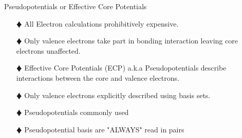 \documentclass[slidestop,mathserif,compress,xcolor=svgnames]{beamer}
\begin{document}
\begin{frame}
{\begin{block}{Pseudopotentials or Effective Core Potentials}
\begin{enumerate}
\item[$\vardiamond$]All Electron calculations prohibitively expensive.
\item[$\vardiamond$]Only valence electrons take part in bonding interaction leaving core electrons unaffected.\item[$\vardiamond$]Effective Core Potentials (ECP) a.k.a Pseudopotentials describe interactions between the core and valence electrons.
\item[$\vardiamond$]Only valence electrons explicitly described using basis sets.
\item[$\vardiamond$] Pseudopotentials commonly used
\item[$\vardiamond$]Pseudopotential basis are "ALWAYS" read in pairs
\end{enumerate}
\end{block}
}
\end{frame}
\end{document}
